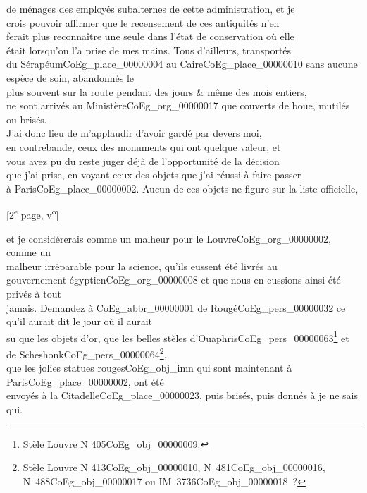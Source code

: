 \documentclass{book}
\begin{document}
de ménages des employés subalternes de cette administration, et je\\
crois pouvoir affirmer que le recensement de ces antiquités n’en\\
ferait plus reconnaître une seule dans l’état de conservation où elle\\
était lorsqu’on l’a prise de mes mains. Tous d’ailleurs, transportés\\
du Sérapéum\gls{CoEg_place_00000004} au Caire\gls{CoEg_place_00000010} sans aucune espèce de soin, abandonnés le\\
plus souvent sur la route pendant des jours \& même des mois entiers,\\
ne sont arrivés au Ministère\gls{CoEg_org_00000017} que couverts de boue, mutilés ou brisés.\\
J’ai donc lieu de m’applaudir d’avoir gardé par devers moi,\\
en contrebande, ceux des monuments qui ont quelque valeur, et\\
vous avez pu du reste juger déjà de l’opportunité de la décision\\
que j’ai prise, en voyant ceux des objets que j’ai réussi à faire passer\\
à Paris\gls{CoEg_place_00000002}. Aucun de ces objets ne figure sur la liste officielle,
{\footnotesize\begin{center} {[2\textsuperscript{e} page, v\textsuperscript{o}]}\end{center}}
\noindent et je considérerais comme un malheur pour le Louvre\gls{CoEg_org_00000002}, comme un\\
malheur irréparable pour la science, qu’ils eussent été livrés au\\
gouvernement égyptien\gls{CoEg_org_00000008} et que nous en eussions ainsi été privés à tout\\
jamais. Demandez à \gls{CoEg_abbr_00000001} de Rougé\gls{CoEg_pers_00000032} ce qu’il aurait dit le jour où il aurait\\
su que les objets d’or, que les belles stèles d’Ouaphris\gls{CoEg_pers_00000063}\footnote{Stèle Louvre N 405\gls{CoEg_obj_00000009}.} et de Scheshonk\gls{CoEg_pers_00000064}\footnote{Stèle Louvre N 413\gls{CoEg_obj_00000010}, N~481\gls{CoEg_obj_00000016}, N~488\gls{CoEg_obj_00000017} ou IM~3736\gls{CoEg_obj_00000018}~?},\\
que les jolies statues rouges\gls{CoEg_obj_imn} qui sont maintenant à Paris\gls{CoEg_place_00000002}, ont été\\
envoyés à la Citadelle\gls{CoEg_place_00000023}, puis brisés, puis donnés à je ne sais qui.\\
\end{document}
